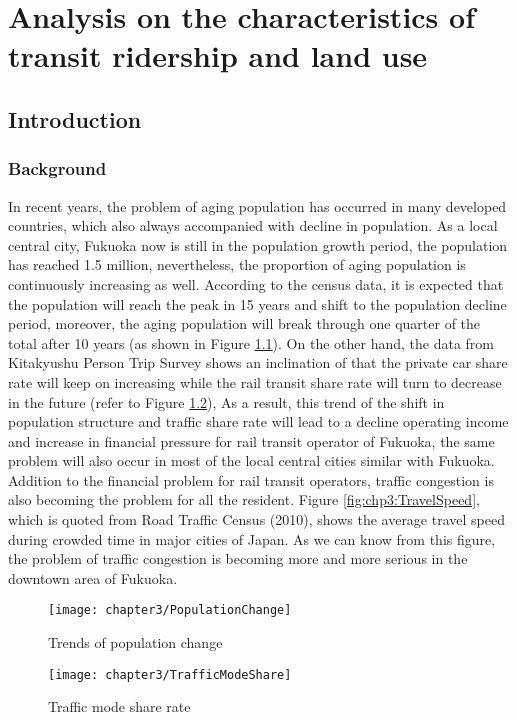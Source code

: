\chapter{Analysis on the characteristics of transit ridership and land use}
%
\section{Introduction}
%
\subsection{Background}
%
In recent years, the problem of aging population has occurred in many developed countries, which also always accompanied with decline in population. As a local central city, Fukuoka now is still in the population growth period, the population has reached 1.5 million, nevertheless, the proportion of aging population is continuously increasing as well. According to the census data, it is expected that the population will reach the peak in 15 years and shift to the population decline period, moreover, the aging population will break through one quarter of the total after 10 years (as shown in Figure \ref{fig:chp3:PopulationChange}). On the other hand, the data from Kitakyushu Person Trip Survey shows an inclination of that the private car share rate will keep on increasing while the rail transit share rate will turn to decrease in the future (refer to Figure \ref{fig:chp3:TrafficModeShare}), As a result, this trend of the shift in population structure and traffic share rate will lead to a decline operating income and increase in financial pressure for rail transit operator of Fukuoka, the same problem will also occur in most of the local central cities similar with Fukuoka. Addition to the financial problem for rail transit operators, traffic congestion is also becoming the problem for all the resident. Figure \ref{fig:chp3:TravelSpeed}, which is quoted from Road Traffic Census (2010), shows the average travel speed during crowded time in major cities of Japan. As we can know from this figure, the problem of traffic congestion is becoming more and more serious in the downtown area of Fukuoka.

%
\begin{figure}[htbp]
	\centering
	\texttt{[image: chapter3/PopulationChange]}
	\caption{Trends of population change}
	\label{fig:chp3:PopulationChange}
\end{figure}

%
\begin{figure}[htbp]
	\centering
	\texttt{[image: chapter3/TrafficModeShare]}
	\caption{Traffic mode share rate}
	\label{fig:chp3:TrafficModeShare}
\end{figure}

